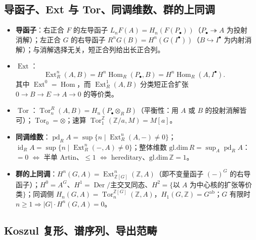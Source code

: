 \documentclass[12pt,a4paper]{ctexart}
\DeclareMathOperator{\Hom}{Hom}
\DeclareMathOperator{\Ext}{Ext}
\DeclareMathOperator{\Tor}{Tor}
\DeclareMathOperator{\Der}{Der}
\DeclareMathOperator{\pd}{pd}
\DeclareMathOperator{\id}{id}
\begin{document}
\subsection{导函子、Ext 与 Tor、同调维数、群的上同调}

\begin{itemize}
  \item \textbf{导函子}：右正合 $F$ 的左导函子 $L_nF(A)=H_n(F(P_\bullet))$（$P_\bullet\twoheadrightarrow A$ 为投射消解）；左正合 $G$ 的右导函子 $R^nG(B)=H^n(G(I^\bullet))$（$B\hookrightarrow I^\bullet$ 为内射消解）；与消解选择无关，短正合列给出长正合列。
  \item \textbf{$\Ext$}：
  \[
    \Ext_R^n(A,B)
    =H^n\Hom_R(P_\bullet,B)
    =H^n\Hom_R(A,I^\bullet).
  \]
  其中 $\Ext^0=\Hom$，而 $\Ext^1_R(A,B)$ 分类短正合扩张
  $0\to B\to E\to A\to0$ 的等价类。
  \item \textbf{$\Tor$}：$\Tor_n^R(A,B)=H_n(P_\bullet\otimes_RB)$（平衡性：用 $A$ 或 $B$ 的投射消解皆可）；$\Tor_0=\otimes$；速算 $\Tor_1^\mathbb Z(\mathbb Z/a,M)=M[a]$。
  \item \textbf{同调维数}：$\pd_RA=\sup\{n\mid\Ext_R^n(A,-)\neq0\}$；$\id_RA=\sup\{n\mid\Ext_R^n(-,A)\neq0\}$；整体维数 $\mathrm{gl.dim}\,R=\sup_A\pd_RA$：$=0$ $\Longleftrightarrow$ 半单 Artin、$\le1$ $\Longleftrightarrow$ hereditary、$\mathrm{gl.dim}\,\mathbb Z=1$。
  \item \textbf{群的上同调}：$H^n(G,A)=\Ext^n_{\mathbb Z[G]}(\mathbb Z,A)$（即不变量函子 $(-)^G$ 的右导函子）；$H^0=A^G$、$H^1=\Der/\text{主交叉同态}$、$H^2=\{$以 $A$ 为中心核的扩张等价类$\}$；同调侧 $H_n(G,A)=\Tor_n^{\mathbb Z[G]}(\mathbb Z,A)$，$H_1(G,\mathbb Z)=G^{\mathrm{ab}}$；$G$ 有限时 $n\ge1\Rightarrow|G|\cdot H^n(G,A)=0$。
\end{itemize}

\subsection{Koszul 复形、谱序列、导出范畴}
\end{document}

